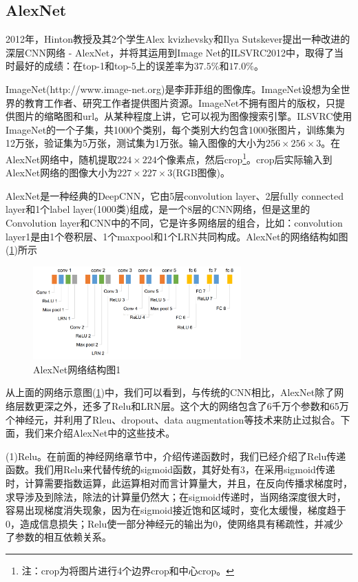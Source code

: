     \subsection{AlexNet}
        \par
        2012年，Hinton教授及其2个学生Alex kvizhevsky和Ilya Sutskever提出一种改进的深层CNN网络 - AlexNet，并将其运用到Image Net的ILSVRC2012中，取得了当时最好的成绩：在top-1和top-5上的误差率为$37.5\%$和$17.0\%$。
        \par
        ImageNet(http://www.image-net.org)是李菲菲组的图像库。ImageNet设想为全世界的教育工作者、研究工作者提供图片资源。ImageNet不拥有图片的版权，只提供图片的缩略图和url。从某种程度上讲，它可以视为图像搜索引擎。ILSVRC使用ImageNet的一个子集，共1000个类别，每个类别大约包含1000张图片，训练集为12万张，验证集为5万张，测试集为1万张。输入图像的大小为$256\times 256 \times 3$。在AlexNet网络中，随机提取$224\times 224$个像素点，然后crop\footnote{注：crop为将图片进行4个边界crop和中心crop。}。crop后实际输入到AlexNet网络的图像大小为$227\times 227\times 3$(RGB图像)。
        \par
        AlexNet是一种经典的DeepCNN，它由5层convolution layer、2层fully connected layer和1个label layer(1000类)组成，是一个8层的CNN网络，但是这里的Convolution layer和CNN中的不同，它是许多网络层的组合，比如：convolution layer1是由1个卷积层、1个maxpool和1个LRN共同构成。AlexNet的网络结构如图(\ref{fig:AlexNet网络结构图1})所示
            \begin{figure}[H]
            \centering
            \includegraphics[width=8cm]{images/AlexNet1.jpg}
            \caption{AlexNet网络结构图1}
            \label{fig:AlexNet网络结构图1}
            \end{figure}
        \par
        从上面的网络示意图(\ref{fig:AlexNet网络结构图1})中，我们可以看到，与传统的CNN相比，AlexNet除了网络层数更深之外，还多了Relu和LRN层。这个大的网络包含了6千万个参数和65万个神经元，并利用了Rleu、dropout、data augmentation等技术来防止过拟合。下面，我们来介绍AlexNet中的这些技术。
        \par
        (1)Relu。在前面的神经网络章节中，介绍传递函数时，我们已经介绍了Relu传递函数。我们用Relu来代替传统的sigmoid函数，其好处有3，在采用sigmoid传递时，计算需要指数运算，此运算相对而言计算量大，并且，在反向传播求梯度时，求导涉及到除法，除法的计算量仍然大；在sigmoid传递时，当网络深度很大时，容易出现梯度消失现象，因为在sigmoid接近饱和区域时，变化太缓慢，梯度趋于0，造成信息损失；Relu使一部分神经元的输出为0，使网络具有稀疏性，并减少了参数的相互依赖关系。
